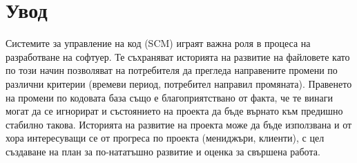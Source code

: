 \documentclass[a4paper]{article}
\begin{document}
% 
% 
% 
% 
% 
% 
% 
%
%
%

% 


\section{Увод}
Системите за управление на код (SCM) играят важна роля в процеса на
разработване на софтуер. Те съхраняват историята на развитие на файловете като
по този начин позволяват на потребителя да прегледа направените промени по
различни критерии (времеви период, потребител направил промяната).
Правенето на промени по кодовата база също е благоприятствано от факта, че те
винаги могат да се игнорират и състоянието на проекта да бъде върнато към
предишно стабилно такова. Историята на развитие на проекта може да бъде
използвана и от хора интересуващи се от прогреса по проекта (мениджъри,
клиенти), с цел създаване на план за по-нататъшно развитие и оценка за свършена
работа.
\end{document}
